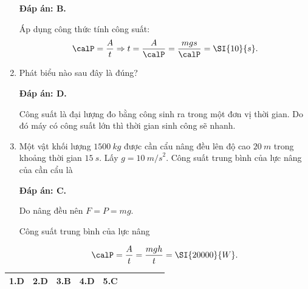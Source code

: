 \begin{enumerate}[label=\bfseries Câu \arabic*:, leftmargin=1.5cm]
	\hideall
	{	
		\textbf{Đáp án: B.}
		
		Áp dụng công thức tính công suất:
		$$\calP = \dfrac{A}{t} \Rightarrow t = \dfrac{A}{\calP}  = \dfrac{mgs}{\calP} = \SI{10}{s}.$$
	}
	\item {}
	
	
	{Phát biểu nào sau đây là đúng?
	}
	
	\hideall
	{	
		\textbf{Đáp án: D.}
		
		Công suất là đại lượng đo bằng công sinh ra trong một đơn vị thời gian. Do đó máy có công suất lớn thì thời gian sinh công sẽ nhanh.
	}
	\item {}
	
	
	{Một vật khối lượng $\SI{1500}{kg}$ được cần cẩu nâng đều lên độ cao $\SI{20}{m}$ trong khoảng thời gian $\SI{15}{s}$. Lấy $g = \SI{10}{m/s}^2$. Công suất trung bình của lực nâng của cần cẩu là
	}
	
	\hideall
	{	\textbf{Đáp án: C.}
		
		Do nâng đều nên $F = P = mg$.
		
		Công suất trung bình của lực nâng
		
		$$\calP = \dfrac{A}{t} = \dfrac{mgh}{t} = \SI{20000}{W}.$$
	}
\end{enumerate}
\ANSMCQ
{	\begin{center}
		\begin{tabular}{|m{2.8em}|m{2.8em}|m{2.8em}|m{2.8em}|m{2.8em}|m{2.8em}|m{2.8em}|m{2.8em}|m{2.8em}|m{2.8em}|}
			\hline
			1.D  & 2.D  & 3.B  & 4.D & 5.C  &   &   &   &   &   \\
			\hline
		\end{tabular}
	\end{center}
}
